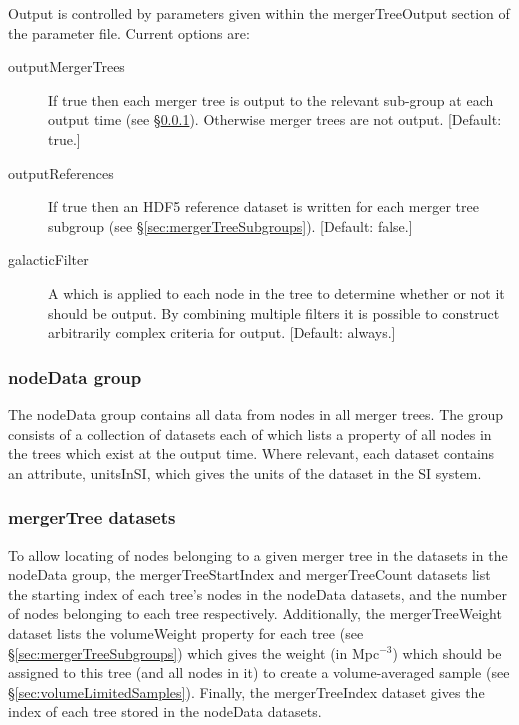 Output is controlled by parameters given within the {\normalfont \ttfamily mergerTreeOutput} section of the parameter file. Current options are:
\begin{description}
\item[{\normalfont \ttfamily outputMergerTrees}] If {\normalfont \ttfamily true} then each merger tree is output to the relevant sub-group at each output time (see \S\ref{sec:nodeDataGroup}). Otherwise merger trees are not output. [Default: {\normalfont \ttfamily true}.]
\item[{\normalfont \ttfamily outputReferences}] If {\normalfont \ttfamily true} then an HDF5 reference dataset is written for each merger tree subgroup (see \S\ref{sec:mergerTreeSubgroups}). [Default: {\normalfont \ttfamily false}.]
\item[{\normalfont \ttfamily galacticFilter}] A  which is applied to each node in the tree to determine whether or not it should be output. By combining multiple filters it is possible to construct arbitrarily complex criteria for output. [Default: {\normalfont \ttfamily always}.]
\end{description}

\subsubsection{nodeData group}\label{sec:nodeDataGroup}

The {\normalfont \ttfamily nodeData} group contains all data from nodes in all merger trees. The group consists of a collection of datasets each of which lists a property of all nodes in the trees which exist at the output time. Where relevant, each dataset contains an attribute, {\normalfont \ttfamily unitsInSI}, which gives the units of the dataset in the SI system.

\subsubsection{mergerTree datasets}\label{sec:mergerTreeDatasets}

To allow locating of nodes belonging to a given merger tree in the datasets in the {\normalfont \ttfamily nodeData} group, the {\normalfont \ttfamily mergerTreeStartIndex} and {\normalfont \ttfamily mergerTreeCount} datasets list the starting index of each tree's nodes in the {\normalfont \ttfamily nodeData} datasets, and the number of nodes belonging to each tree respectively. Additionally, the {\normalfont \ttfamily mergerTreeWeight} dataset lists the {\normalfont \ttfamily volumeWeight} property for each tree (see \S\ref{sec:mergerTreeSubgroups}) which gives the weight (in Mpc$^{-3}$) which should be assigned to this tree (and all nodes in it) to create a volume-averaged sample (see \S\ref{sec:volumeLimitedSamples}). Finally, the {\normalfont \ttfamily mergerTreeIndex} dataset gives the index of each tree stored in the {\normalfont \ttfamily nodeData} datasets.

